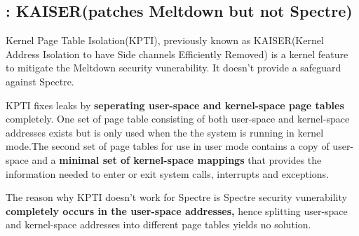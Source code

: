 \documentclass[12pt]{article}
\begin{document}
\begin{appendices}
\section{: KAISER(patches Meltdown but not Spectre)}

Kernel Page Table Isolation(KPTI), previously known as KAISER(Kernel Address Isolation to have Side channels Efficiently Removed) is a kernel feature to mitigate the Meltdown security vunerability. It doesn't provide a safeguard against Spectre.

KPTI fixes leaks by \textbf{seperating user-space and kernel-space page tables} completely. One set of page table consisting of both user-space and kernel-space addresses exists but is only used when the the system is running in kernel mode.The second set of page tables for use in user mode contains a copy of user-space and a \textbf{minimal set of kernel-space mappings} that provides the information needed to enter or exit system calls, interrupts and exceptions.

The reason why KPTI doesn't work for Spectre is Spectre security vunerability \textbf{completely occurs in the user-space addresses,} hence splitting user-space and kernel-space addresses into different page tables yields no solution.

   
	
\end{appendices}
\end{document}
